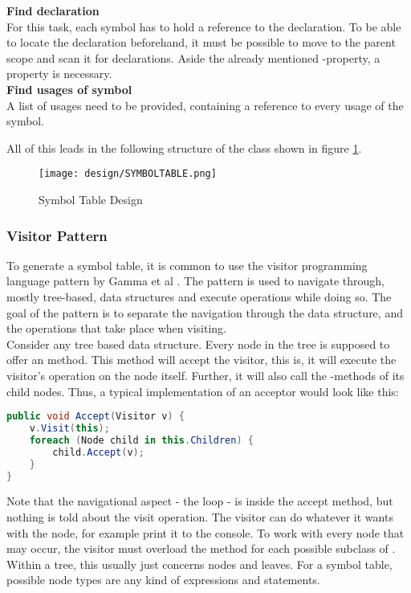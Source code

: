 \textbf{Find declaration}\\
For this task, each symbol has to hold a reference to the declaration.
To be able to locate the declaration beforehand, it must be possible to move to the parent scope and scan it for declarations.
Aside the already mentioned -property, a   property is necessary. \\

\textbf{Find usages of symbol}\\
A list of usages need to be provided, containing a reference to every usage of the symbol.

All of this leads in the following structure of the class  shown in figure \ref{fig:symboltabledesign}.

\begin{figure}[H]
    \centering
    \texttt{[image: design/SYMBOLTABLE.png]}
    \caption{Symbol Table Design}
    \label{fig:symboltabledesign}
\end{figure}


\subsubsection{Visitor Pattern}
To generate a symbol table, it is common to use the visitor programming language pattern by Gamma et al \cite{gofBook}.
The pattern is used to navigate through, mostly tree-based, data structures and execute operations while doing so.
The goal of the pattern is to separate the navigation through the data structure, and the operations that take place when visiting.\\

Consider any tree based data structure.
Every node in the tree is supposed to offer an  method.
This method will accept the visitor, this is, it will execute the visitor's operation on the node itself.
Further, it will also call the -methods of its child nodes.
Thus, a typical implementation of an acceptor would look like this:

\begin{lstlisting}[language=csharp, caption={Example for Accept}, captionpos=b, label={lst:accept}]
public void Accept(Visitor v) {
    v.Visit(this);
    foreach (Node child in this.Children) {
        child.Accept(v);
    }
}
\end{lstlisting}

Note that the navigational aspect - the  loop - is inside the accept method, but nothing is told about the visit operation.
The visitor can do whatever it wants with the node, for example print it to the console.
To work with every node that may occur, the visitor must overload the  method for each possible subclass of .
Within a tree, this usually just concerns nodes and leaves.
For a symbol table, possible node types are any kind of expressions and statements.\\

